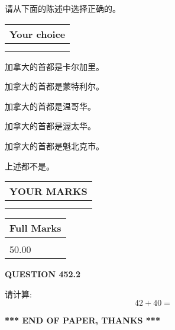 \documentclass{ctexart}
\begin{document}
  
请从下面的陈述中选择正确的。
  
  
\noindent\hspace{3.0in} \begin{tabular}{|l|}
\hline
Your choice \\
\hline
 \\ 
 \\ 
\hline
\end{tabular}
  
  
 
 
加拿大的首都是卡尔加里。
 
 
加拿大的首都是蒙特利尔。
 
 
加拿大的首都是温哥华。
 
 
加拿大的首都是渥太华。
 
 
加拿大的首都是魁北克市。
 
 
 上述都不是。
 
 
  
\vspace{0.2in}
  
\noindent\begin{tabular}{|l|}
\hline
 YOUR MARKS  \\
\hline
 \\ 
 \\ 
\hline
\end{tabular}
\hspace{0.05in} \begin{tabular}{|l|}
\hline
 Full Marks  \\
\hline
 \\ 
50.00 \\
\hline
\end{tabular}
{\textbf{\Large{QUESTION
452.2 
}}}
  
  
 
请计算:
\begin{equation}
42 +  %
40 = \nonumber
\end{equation}
 

 

 
   
   
 \vspace{0.2in}
 
   
   
   
   
\vspace{1.0in} 
{\textbf{\large{ *** END OF PAPER, THANKS *** }}} 
   
\end{document}
